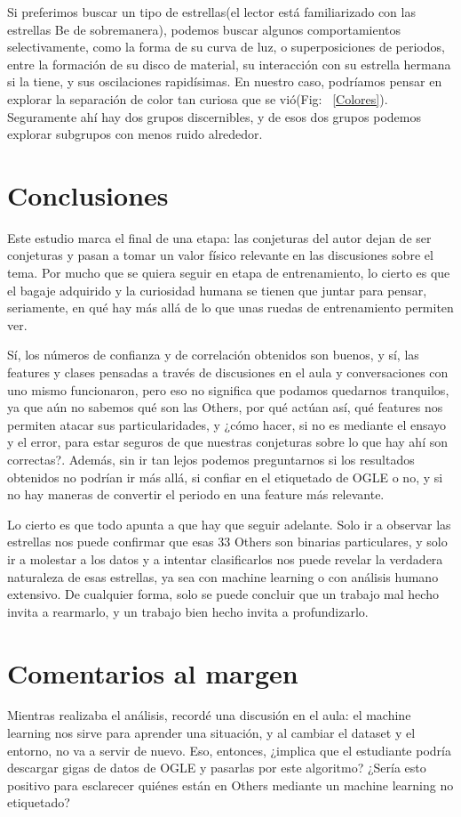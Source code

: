 \documentclass[10pt,twocolumn]{article}
\begin{document}
Si preferimos buscar un tipo de estrellas(el lector está familiarizado con las estrellas Be de sobremanera), podemos buscar algunos comportamientos selectivamente, como la forma de 
su curva de luz, o superposiciones de periodos, entre la formación de su disco de material, su interacción con su estrella hermana si la tiene, y sus oscilaciones rapidísimas. 
En nuestro caso, podríamos pensar en explorar la separación de color tan curiosa que se vió(Fig: ~\ref{Colores}). Seguramente ahí hay dos grupos discernibles, y de esos dos grupos 
podemos explorar subgrupos con menos ruido alrededor. 

\section{Conclusiones}

Este estudio marca el final de una etapa: las conjeturas del autor dejan de ser conjeturas y pasan a tomar un valor físico relevante en las discusiones sobre el tema. Por mucho que se 
quiera seguir en etapa de entrenamiento, lo cierto es que el bagaje adquirido y la curiosidad humana se tienen que juntar para pensar, seriamente, en qué hay más allá de lo que unas 
ruedas de entrenamiento permiten ver. 

Sí, los números de confianza y de correlación obtenidos son buenos, y sí, las features y clases pensadas a través de discusiones en el aula y conversaciones con uno mismo funcionaron, 
pero eso no significa que podamos quedarnos tranquilos, ya que aún no sabemos qué son las Others, por qué actúan así, qué features nos permiten atacar sus particularidades, y ¿cómo 
hacer, si no es mediante el ensayo y el error, para estar seguros de que nuestras conjeturas sobre lo que hay ahí son correctas?. Además, sin ir tan lejos podemos preguntarnos si 
los resultados obtenidos no podrían ir más allá, si confiar en el etiquetado de OGLE o no, y si no hay maneras de convertir el periodo en una feature más relevante. 

Lo cierto es que todo apunta a que hay que seguir adelante. Solo ir a observar las estrellas nos puede confirmar que esas 33 Others son binarias particulares, y solo ir a 
molestar a los datos y a intentar clasificarlos nos puede revelar la verdadera naturaleza de esas estrellas, ya sea con machine learning o con análisis humano extensivo. 
De cualquier forma, solo se puede concluir que un trabajo mal hecho invita a rearmarlo, y un trabajo bien hecho invita a profundizarlo. 

\section*{Comentarios al margen}

Mientras realizaba el análisis, recordé una discusión en el aula: el machine learning nos sirve para aprender una situación, y al cambiar el dataset y el entorno, no va a servir de 
nuevo. Eso, entonces, ¿implica que el estudiante podría descargar gigas de datos de OGLE y pasarlas por este algoritmo? ¿Sería esto positivo para esclarecer quiénes están en Others 
mediante un machine learning no etiquetado?
\end{document}
